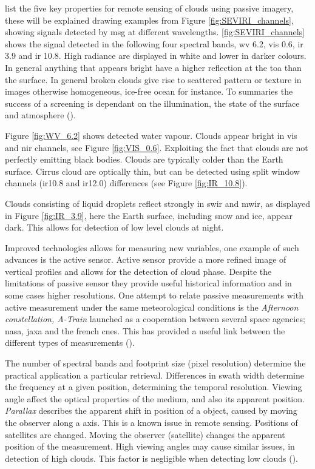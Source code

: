 \citeauthor{Karlsson2015AdvancingData} list the five key properties for remote sensing of clouds using passive imagery, these will be explained drawing examples from Figure \ref{fig:SEVIRI_channels}, showing signals detected by \acrshort{msg} at different wavelengths. \ref{fig:SEVIRI_channels} shows the signal detected in the following four spectral bands, \acrshort{wv} 6.2, \acrshort{vis} 0.6, \acrshort{ir} 3.9 and \acrshort{ir} 10.8. High radiance are displayed in white and lower in darker colours. In general anything that appears bright have a higher reflection at the \acrshort{toa} than the surface.  In general broken clouds give rise to scattered pattern or texture in images otherwise homogeneous, ice-free ocean for instance. To summaries the success of a screening is dependant on the illumination, the state of the surface and atmosphere (\cite{Karlsson2015AdvancingData}).  

Figure \ref{fig:WV_6.2} shows detected water vapour. Clouds appear bright in \acrfull{vis} and \acrfull{nir} channels, see Figure \ref{fig:VIS_0.6}.  Exploiting the fact that clouds are not perfectly emitting black bodies. Clouds are typically colder than the Earth surface. Cirrus cloud are optically thin, but can be detected using split window channels (\acrshort{ir}10.8 and \acrshort{ir}12.0) differences (see Figure \ref{fig:IR_10.8}). 

Clouds consisting of liquid droplets reflect strongly in \acrfull{swir} and \acrfull{mwir}, as displayed in Figure \ref{fig:IR_3.9}, here the Earth surface, including snow and ice, appear dark. This allows for detection of low level clouds at night. 

Improved technologies allows for measuring new variables, one example of such advances is the active sensor. Active sensor provide a more refined image of vertical profiles and allows for the detection of cloud phase. Despite the limitations of passive sensor they provide useful historical information and in some cases higher resolutions. One attempt to relate passive measurements with active measurement under the same meteorological conditions is the \textit{Afternoon constellation, A-Train} launched as a cooperation between several space agencies; \acrfull{nasa}, \acrlong{jaxa} and the french \acrfull{cnes}. This has provided a useful link between the different types of measurements (\cite{Stephens2018CloudsatSystem}). 

The number of spectral bands and footprint size (pixel resolution) determine the practical application a particular retrieval. Differences in swath width determine the frequency at a given position, determining the temporal resolution. Viewing angle affect the optical properties of the medium, and also its apparent position. \textit{Parallax} describes the apparent shift in position of a object, caused by moving the observer along a axis. This is a known issue in remote sensing. Positions of satellites are changed. Moving the observer (satellite) changes the apparent position of the measurement. 
High viewing angles may cause similar issues, in detection of high clouds. This factor is negligible when detecting low clouds (\cite{Joro2010ComparisonFinland}). 

